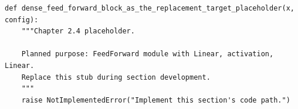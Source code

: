 \begin{lstlisting}[style=bookpython,caption={Planned code placeholder for dense feed forward block as the replacement target.},label={lst:ch02-dense-feed-forward-block-as-the-replacement-target}]
def dense_feed_forward_block_as_the_replacement_target_placeholder(x, config):
    """Chapter 2.4 placeholder.

    Planned purpose: FeedForward module with Linear, activation, Linear.
    Replace this stub during section development.
    """
    raise NotImplementedError("Implement this section's code path.")
\end{lstlisting}
